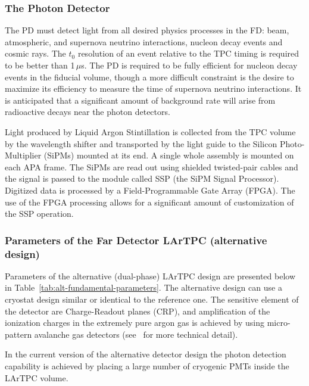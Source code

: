 \subsubsection{The Photon Detector}
\label{sec:pd}
The PD must detect light from all desired physics processes in the FD: beam, atmospheric, and supernova neutrino interactions,
nucleon decay events and cosmic rays.  The $t_0$ resolution of an event relative to the TPC timing is required to be
better than 1\,$\mu$s.  The PD is required to be fully efficient for nucleon decay events in the fiducial volume, though a
more difficult constraint is the desire to maximize its efficiency to measure the time of supernova neutrino interactions.
It is anticipated that a significant amount of background rate will arise from radioactive decays near the photon detectors.

Light produced by Liquid Argon Stintillation is collected from the TPC volume by the wavelength shifter and transported
by the light guide to the Silicon Photo-Multiplier (SiPMs) mounted at its end. A single whole assembly is mounted on each  APA frame.
The SiPMs are read out using shielded twisted-pair cables and the signal is passed to the module called SSP (the SiPM Signal
Processor). Digitized data is processed by a  Field-Programmable Gate Array (FPGA). The use
of the FPGA processing allows for a significant amount of customization of the SSP operation.

\subsubsection{Parameters of the Far Detector LArTPC (alternative design)}
Parameters of the alternative (dual-phase) LArTPC design are presented below in Table~\ref{tab:alt-fundamental-parameters}.
The alternative design can use a cryostat design similar or identical  to the reference one. The sensitive element of the detector
are Charge-Readout planes (CRP), and amplification of the ionization charges in the extremely pure
argon gas is achieved by using micro-pattern avalanche gas detectors (see~\cite{cdr_vol2} for more technical detail).

In the current version of the alternative detector design the photon detection capability is achieved by placing a large number
of cryogenic PMTs inside the LArTPC volume.

